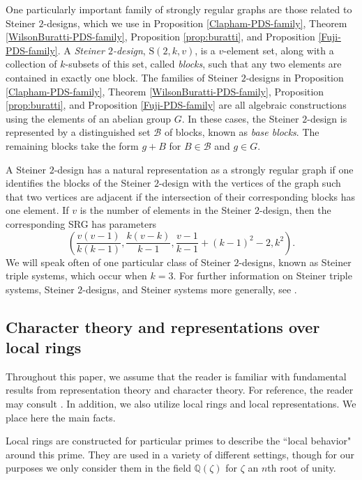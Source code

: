 \documentclass[12pt]{amsproc} %
\theoremstyle{definition}\newtheorem{defn}[thm]{Definition}
\theoremstyle{definition}\newtheorem{rem}[thm]{Remark}
\theoremstyle{definition}\newtheorem{ex}[thm]{Example}
\newcommand{\Q}{\mathbb{Q}}
\renewcommand{\S}{{\mathrm S}}
\begin{document}
One particularly important family of strongly regular graphs are those related to Steiner $2$-designs, which we use in Proposition \ref{Clapham-PDS-family}, Theorem \ref{WilsonBuratti-PDS-family}, Proposition \ref{prop:buratti}, and Proposition \ref{Fuji-PDS-family}. A \textit{Steiner $2$-design}, $\S(2, k, v)$, is a $v$-element set, along with a collection of $k$-subsets of this set, called {\it blocks}, such that any two elements are contained in exactly one block. The families of Steiner $2$-designs in Proposition \ref{Clapham-PDS-family}, Theorem \ref{WilsonBuratti-PDS-family}, Proposition \ref{prop:buratti}, and Proposition \ref{Fuji-PDS-family} are all algebraic constructions using the elements of an abelian group $G$. In these cases, the Steiner $2$-design is represented by a distinguished set $\mathscr{B}$ of blocks, known as {\it base blocks}. The remaining blocks take the form $g + B$ for $B \in \mathscr{B}$ and $g \in G$.

A Steiner $2$-design has a natural representation as a strongly regular graph if one identifies the blocks of the Steiner $2$-design with the vertices of the graph such that two vertices are adjacent if the intersection of their corresponding blocks has one element. If $v$ is the number of elements in the Steiner $2$-design, then the corresponding SRG has parameters
	\[ \left(\frac{v(v - 1)}{k(k-1)}, \frac{k(v-k)}{k-1}, \frac{v -1}{k-1} + (k-1)^2 -2, k^2 \right).\] 
We will speak often of one particular class of Steiner $2$-designs, known as Steiner triple systems, which occur when $k = 3$. For further information on Steiner triple systems, Steiner $2$-designs, and Steiner systems more generally, see \cite[Section I.4]{handbook-comb-des}.




\subsection{Character theory and representations over local rings}

Throughout this paper, we assume that the reader is familiar with fundamental results from representation theory and character theory. For reference, the reader may consult \cite[Chapter 2]{isaacs}. In addition, we also utilize local rings and local representations. We place here the main facts.

Local rings are constructed for particular primes to describe the ``local behavior" around this prime. They are used in a variety of different settings, though for our purposes we only consider them in the field $\Q(\zeta)$ for $\zeta$ an $n$th root of unity.
\end{document}
